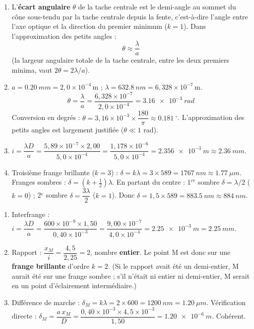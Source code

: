 \documentclass[11pt]{article}
\providecommand{\degree}{^{\circ}}
\begin{document}
\begin{corrige}
\begin{enumerate}
    \item L'\textbf{écart angulaire} $\theta$ de la tache centrale est le demi-angle au sommet du cône sous-tendu par la tache centrale depuis la fente, c'est-à-dire l'angle entre l'axe optique et la direction du premier minimum ($k = 1$). Dans l'approximation des petits angles :
    \[ \theta \approx \frac{\lambda}{a} \]
    (la largeur angulaire totale de la tache centrale, entre les deux premiers minima, vaut $2\theta = 2\lambda/a$).
    \item $a = \SI{0,20}{mm} = 2,0\times10^{-4}\,\text{m}$ ; $\lambda = \SI{632,8}{nm} = 6,328\times10^{-7}\,\text{m}$.
    \[ \theta = \frac{\lambda}{a} = \frac{6,328\times10^{-7}}{2,0\times10^{-4}} = \SI{3,16e-3}{rad} \]
    Conversion en degrés : $\theta = 3,16\times10^{-3} \times \dfrac{180}{\pi} \approx \SI{0,181}{\degree}$. L'approximation des petits angles est largement justifiée ($\theta \ll 1$ rad).
    \item $i = \dfrac{\lambda D}{a} = \dfrac{5,89\times10^{-7} \times 2,00}{5,0\times10^{-4}} = \dfrac{1,178\times10^{-6}}{5,0\times10^{-4}} = \SI{2,356e-3}{m} \approx \SI{2,36}{mm}$.
    \item Troisième frange brillante ($k = 3$) : $\delta = k\lambda = 3 \times 589 = \SI{1767}{nm} \approx \SI{1,77}{\mu m}$.
    Franges sombres : $\delta = \left(k+\tfrac{1}{2}\right)\lambda$. En partant du centre : 1$^{re}$ sombre $\delta = \lambda/2$ ($k=0$) ; 2$^{e}$ sombre $\delta = \dfrac{3\lambda}{2}$ ($k=1$). Donc $\delta = 1,5 \times 589 = \SI{883,5}{nm} \approx \SI{884}{nm}$.
\end{enumerate}
\end{corrige}

\begin{corrige}
\begin{enumerate}
    \item Interfrange : $i = \dfrac{\lambda D}{a} = \dfrac{600\times10^{-9} \times 1,50}{0,40\times10^{-3}} = \dfrac{9,00\times10^{-7}}{4,0\times10^{-4}} = \SI{2,25e-3}{m} = \SI{2,25}{mm}$.
    \item Rapport : $\dfrac{x_M}{i} = \dfrac{4,5}{2,25} = 2$, nombre \textbf{entier}. Le point M est donc sur une \textbf{frange brillante} d'ordre $k = 2$.
    (Si le rapport avait été un demi-entier, M aurait été sur une frange sombre ; s'il n'était ni entier ni demi-entier, M serait en un point d'éclairement intermédiaire.)
    \item Différence de marche : $\delta_M = k\lambda = 2 \times 600 = \SI{1200}{nm} = \SI{1,20}{\mu m}$.
    Vérification directe : $\delta_M = \dfrac{a\,x_M}{D} = \dfrac{0,40\times10^{-3} \times 4,5\times10^{-3}}{1,50} = \SI{1,20e-6}{m}$. Cohérent.
\end{enumerate}
\end{corrige}
\end{document}
